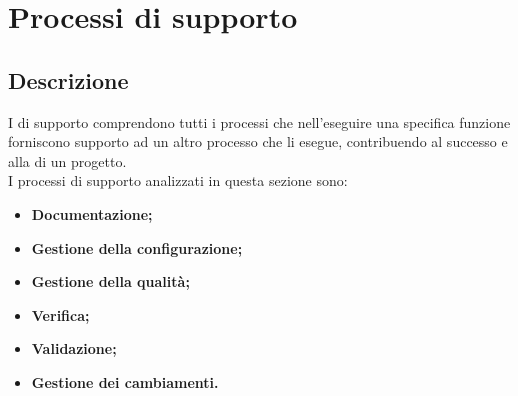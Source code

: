 \section{Processi di supporto}\label{ProcSup}
\subsection{Descrizione}\label{PSup_Descrizione}
I  di supporto comprendono tutti i processi che nell'eseguire una specifica funzione forniscono supporto ad un altro processo che li esegue, contribuendo al successo e alla  di un progetto.\\
I processi di supporto analizzati in questa sezione sono:
\begin{itemize}
	\item \textbf{Documentazione;}
	\item \textbf{Gestione della configurazione;}
	\item \textbf{Gestione della qualità;}
	\item \textbf{Verifica;}
	\item \textbf{Validazione;}
	\item \textbf{Gestione dei cambiamenti.}
\end{itemize}


\newpage

\newpage

\newpage

\newpage

\newpage
